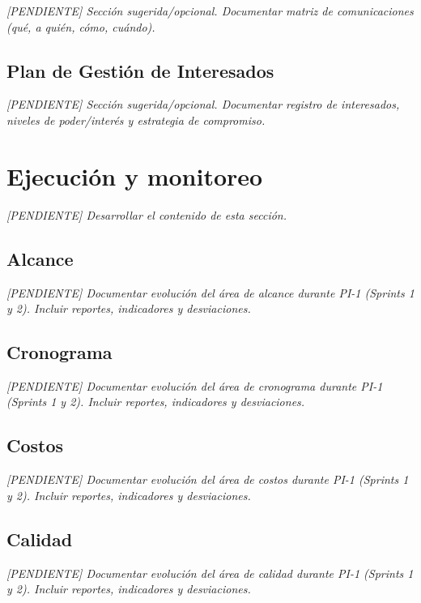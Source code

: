 \documentclass[12pt,a4paper,oneside]{report}
\newcommand{\pendiente}[1]{\textit{[PENDIENTE] #1}}
\begin{document}
\pendiente{Sección sugerida/opcional. Documentar matriz de comunicaciones (qué, a quién, cómo, cuándo).}

\subsection{Plan de Gestión de Interesados}\label{subsec:plan-de-gestion-de-interesados}

\pendiente{Sección sugerida/opcional. Documentar registro de interesados, niveles de poder/interés y estrategia de compromiso.}

\section{Ejecución y monitoreo}\label{sec:ejecucion-y-monitoreo}

\textit{[PENDIENTE] Desarrollar el contenido de esta sección.}

\subsection{Alcance}\label{subsec:alcance}

\pendiente{Documentar evolución del área de alcance durante PI-1 (Sprints 1 y 2). Incluir reportes, indicadores y desviaciones.}

\subsection{Cronograma}\label{subsec:cronograma}

\pendiente{Documentar evolución del área de cronograma durante PI-1 (Sprints 1 y 2). Incluir reportes, indicadores y desviaciones.}

\subsection{Costos}\label{subsec:costos}

\pendiente{Documentar evolución del área de costos durante PI-1 (Sprints 1 y 2). Incluir reportes, indicadores y desviaciones.}

\subsection{Calidad}\label{subsec:calidad}

\pendiente{Documentar evolución del área de calidad durante PI-1 (Sprints 1 y 2). Incluir reportes, indicadores y desviaciones.}
\end{document}
